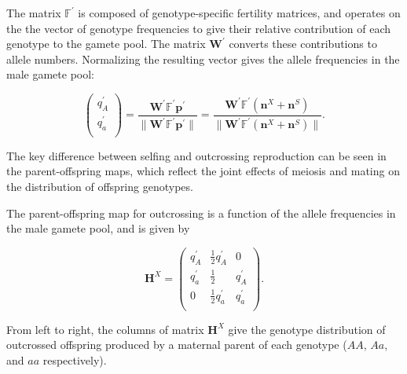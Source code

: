 \documentclass[11pt]{article}
\def\mbf#1{\mathbf{#1}}
\def\mbb#1{\mathbb{#1}}
\def\mcal#1{\mathcal{#1}}
\begin{document}
\noindent The matrix $\mbb{F}^{\prime}$ is composed of genotype-specific fertility matrices, and operates on the the vector of genotype frequencies to give their relative contribution of each genotype to the gamete pool. The matrix $\mbf{W}^{\prime}$ converts these contributions to allele numbers. Normalizing the resulting vector gives the allele frequencies in the male gamete pool:
\begin{linenomath*}
\begin{equation} \label{eq:maleGametePool}
	\left(
		\begin{array}{c}
			q^{\prime}_{A} \\
			q^{\prime}_{a} \\
		\end{array} \right) = 
			\frac{\mbf{W}^{\prime} \mbb{F}^{\prime} \mbf{p}^{\prime}}{\| \mbf{W}^{\prime} \mbb{F}^{\prime} \mbf{p}^{\prime} \|} = 
				\frac{\mbf{W}^{\prime} \mbb{F}^{\prime} (\mbf{n}^X + \mbf{n}^S)}{\| \mbf{W}^{\prime} \mbb{F}^{\prime} (\mbf{n}^X + \mbf{n}^S)\|}.
\end{equation}
\end{linenomath*}
The key difference between selfing and outcrossing reproduction can be seen in the parent-offspring maps, which reflect the joint effects of meiosis and mating on the distribution of offspring genotypes.

The parent-offspring map for outcrossing is a function of the allele frequencies in the male gamete pool, and is given by 
\begin{linenomath*}
\begin{equation} \label{eq:HX}
	\mbf{H}^X = 
			\left(
			\begin{array}{ccc}
				q^{\prime}_{A} & \frac{1}{2} q^{\prime}_{A} & 0 \\
				q^{\prime}_{a} & \frac{1}{2} & q^{\prime}_{A}  \\
				0 & \frac{1}{2} q^{\prime}_{a} & q^{\prime}_{a} \\
			\end{array} \right).
\end{equation}
\end{linenomath*}
\noindent From left to right, the columns of matrix $\mbf{H}^X$ give the genotype distribution of outcrossed offspring produced by a maternal parent of each genotype ($AA$, $Aa$, and $aa$ respectively).
\end{document}
